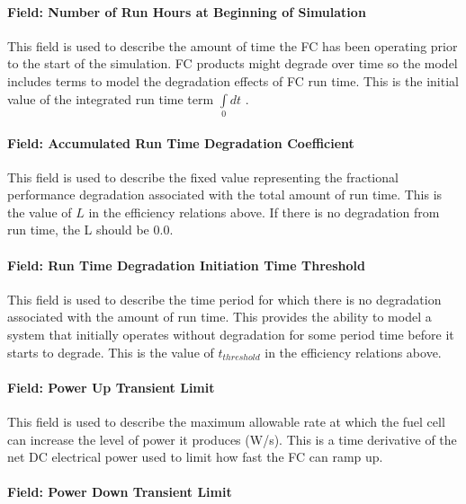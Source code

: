 \paragraph{Field: Number of Run Hours at Beginning of Simulation}\label{field-number-of-run-hours-at-beginning-of-simulation}

This field is used to describe the amount of time the FC has been operating prior to the start of the simulation. FC products might degrade over time so the model includes terms to model the degradation effects of FC run time. This is the initial value of the integrated run time term \(\int\limits_0 {dt}\) .

\paragraph{Field: Accumulated Run Time Degradation Coefficient}\label{field-accumulated-run-time-degradation-coefficient}

This field is used to describe the fixed value representing the fractional performance degradation associated with the total amount of run time. This is the value of \(L\) in the efficiency relations above. If there is no degradation from run time, the L should be 0.0.

\paragraph{Field: Run Time Degradation Initiation Time Threshold}\label{field-run-time-degradation-initiation-time-threshold}

This field is used to describe the time period for which there is no degradation associated with the amount of run time. This provides the ability to model a system that initially operates without degradation for some period time before it starts to degrade. This is the value of \({t_{threshold}}\) in the efficiency relations above.

\paragraph{Field: Power Up Transient Limit}\label{field-power-up-transient-limit}

This field is used to describe the maximum allowable rate at which the fuel cell can increase the level of power it produces (W/s). This is a time derivative of the net DC electrical power used to limit how fast the FC can ramp up.

\paragraph{Field: Power Down Transient Limit}\label{field-power-down-transient-limit}

